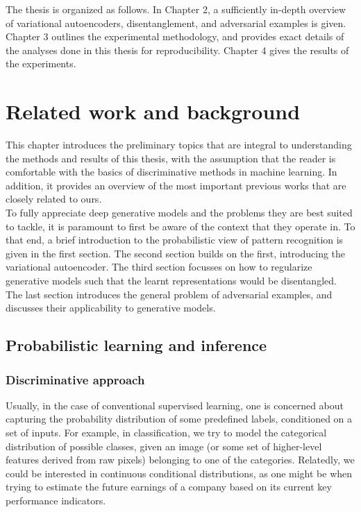 \documentclass{report}
\begin{document}
\noindent The thesis is organized as follows. In Chapter 2, a sufficiently in-depth overview of variational autoencoders, disentanglement, and adversarial examples is given. Chapter 3 outlines the experimental methodology, and provides exact details of the analyses done in this thesis for reproducibility. Chapter 4 gives the results of the experiments. 

\chapter{Related work and background}

This chapter introduces the preliminary topics that are integral to understanding the methods and results of this thesis, with the assumption that the reader is comfortable with the basics of discriminative methods in machine learning. In addition, it provides an overview of the most important previous works that are closely related to ours. \\

\noindent To fully appreciate deep generative models and the problems they are best suited to tackle, it is paramount to first be aware of the context that they operate in. To that end, a brief introduction to the probabilistic view of pattern recognition is given in the first section. The second section builds on the first, introducing the variational autoencoder. The third section focusses on how to regularize generative models such that the learnt representations would be disentangled. The last section introduces the general problem of adversarial examples, and discusses their applicability to generative models.

\section{Probabilistic learning and inference}

\subsection{Discriminative approach}

\noindent Usually, in the case of conventional supervised learning, one is concerned about capturing the probability distribution of some predefined labels, conditioned on a set of inputs. For example, in classification, we try to model the categorical distribution of possible classes, given an image (or some set of higher-level features derived from raw pixels) belonging to one of the categories. Relatedly, we could be interested in continuous conditional distributions, as one might be when trying to estimate the future earnings of a company based on its current key performance indicators. \\
\end{document}
